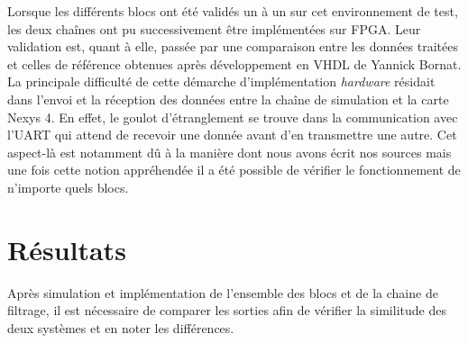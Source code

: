 \documentclass[a4paper,12pt]{article}
\begin{document}
Lorsque les différents blocs ont été validés un à un sur cet environnement de test, les deux chaînes ont pu successivement être implémentées sur FPGA. Leur validation est, quant à elle, passée par une comparaison entre les données traitées et celles de référence obtenues après développement en VHDL de Yannick Bornat. La principale difficulté de cette démarche d'implémentation \textit{hardware} résidait dans l'envoi et la réception des données entre la chaîne de simulation et la carte Nexys 4. En effet, le goulot d'étranglement se trouve dans la communication avec l'UART qui attend de recevoir une donnée avant d'en transmettre une autre. Cet aspect-là est notamment dû à la manière dont nous avons écrit nos sources mais une fois cette notion appréhendée il a été possible de vérifier le fonctionnement de n'importe quels blocs.
\newpage
\section{Résultats}
Après simulation et implémentation de l'ensemble des blocs et de la chaine de filtrage, il est nécessaire de comparer les sorties afin de vérifier la similitude des deux systèmes et en noter les différences.
\end{document}
